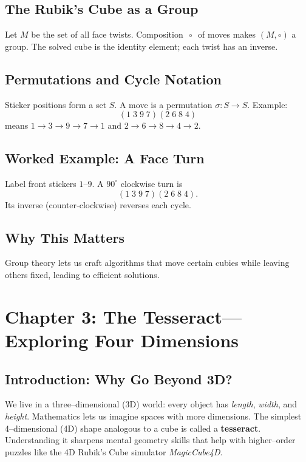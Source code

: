 \documentclass[12pt]{article}
\begin{document}
\subsection*{The Rubik’s Cube as a Group}

Let \(M\) be the set of all face twists. Composition \(\,\circ\,\) of moves makes \((M,\circ)\) a group. The solved cube is the identity element; each twist has an inverse.

\subsection*{Permutations and Cycle Notation}

Sticker positions form a set \(S\). A move is a permutation \(\sigma:S\to S\). Example:
\[
(1\;3\;9\;7)(2\;6\;8\;4)
\]
means \(1\to3\to9\to7\to1\) and \(2\to6\to8\to4\to2\).

\subsection*{Worked Example: A Face Turn}

Label front stickers \(1\)–\(9\). A \(90^\circ\) clockwise turn is
\[
(1\;3\;9\;7)(2\;6\;8\;4).
\]
Its inverse (counter‑clockwise) reverses each cycle.

\subsection*{Why This Matters}

Group theory lets us craft algorithms that move certain cubies while leaving others fixed, leading to efficient solutions.

\section*{Chapter 3: The Tesseract—Exploring Four Dimensions}

\subsection*{Introduction: Why Go Beyond 3D?}
We live in a three–dimensional (3D) world: every object has \emph{length}, \emph{width}, and \emph{height}. Mathematics lets us imagine spaces with more dimensions. The simplest 4–dimensional (4D) shape analogous to a cube is called a \textbf{tesseract}. Understanding it sharpens mental geometry skills that help with higher–order puzzles like the 4D Rubik’s Cube simulator \emph{MagicCube4D}.
\end{document}
